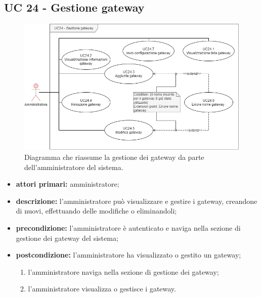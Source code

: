 
		\subsection{UC 24 - Gestione gateway}

		\begin{figure}[H]
			\centering
			\includegraphics[scale=0.60]{res/images/uc24}
			\caption{Diagramma che riassume la gestione dei gateway da parte dell'amministratore del sistema.}
		\end{figure}

		\begin{itemize}
			\item \textbf{attori primari:} amministratore;
			\item \textbf{descrizione:} l'amministratore può visualizzare e gestire i gateway, creandone di nuovi, effettuando delle modifiche o eliminandoli;
			\item \textbf{precondizione:} l'amministratore è autenticato e naviga nella sezione di gestione dei gateway del sistema;
			\item \textbf{postcondizione:} l'amministratore ha visualizzato o gestito un gateway;
			\begin{enumerate}
				\item{l'amministratore naviga nella sezione di gestione dei gateway;}
				\item{l'amministratore visualizza o gestisce i gateway.}
			\end{enumerate} 
		\end{itemize}

